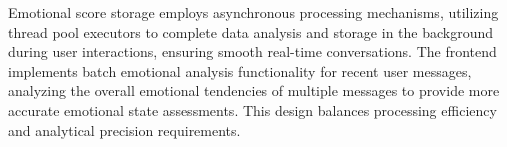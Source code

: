 Emotional score storage employs asynchronous processing mechanisms, utilizing thread pool executors to complete data analysis and storage in the background during user interactions, ensuring smooth real-time conversations. The frontend implements batch emotional analysis functionality for recent user messages, analyzing the overall emotional tendencies of multiple messages to provide more accurate emotional state assessments. This design balances processing efficiency and analytical precision requirements.